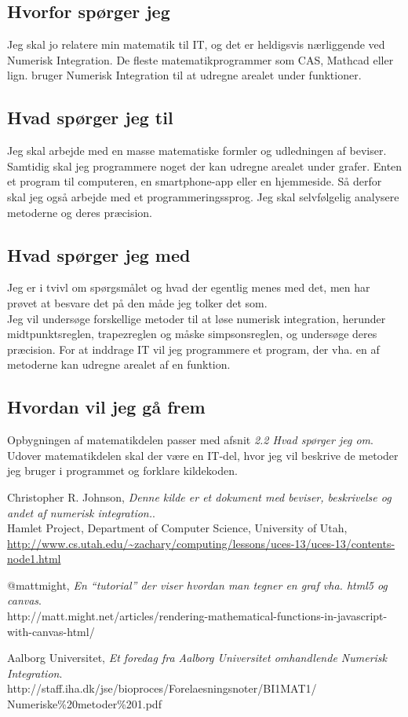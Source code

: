 \documentclass[12pt]{article}
\numberwithin{equation}{section}
\begin{document}
\subsection{Hvorfor spørger jeg}
\label{sec:hvorfor}
Jeg skal jo relatere min matematik til IT, og det er heldigsvis nærliggende ved Numerisk Integration. De fleste matematikprogrammer som CAS, Mathcad eller lign. bruger Numerisk Integration til at udregne arealet under funktioner.
\subsection{Hvad spørger jeg til}
Jeg skal arbejde med en masse matematiske formler og udledningen af beviser. Samtidig skal jeg programmere noget der kan udregne arealet under grafer. Enten et program til computeren, en smartphone-app eller en hjemmeside. Så derfor skal jeg også arbejde med et programmeringssprog. Jeg skal selvfølgelig analysere metoderne og deres præcision.
\subsection{Hvad spørger jeg med}
Jeg er i tvivl om spørgsmålet og hvad der egentlig menes med det, men har prøvet at besvare det på den måde jeg tolker det som.
\\
Jeg vil undersøge forskellige metoder til at løse numerisk integration, herunder midtpunktsreglen, trapezreglen og måske simpsonsreglen, og undersøge deres præcision. For at inddrage IT vil jeg programmere et program, der vha. en af metoderne kan udregne arealet af en funktion.

\subsection{Hvordan vil jeg gå frem}
Opbygningen af matematikdelen passer med afsnit \emph{2.2 Hvad spørger jeg om}. Udover matematikdelen skal der være en IT-del, hvor jeg vil beskrive de metoder jeg bruger i programmet og forklare kildekoden.


\clearpage
{}
\begin{thebibliography}{9}

  	Christopher R. Johnson,
  	\emph{Denne kilde er et dokument med beviser, beskrivelse og andet af numerisk integration.}.\\
  	Hamlet Project, 
  	Department of Computer Science,
	University of Utah,
	\url{http://www.cs.utah.edu/~zachary/computing/lessons/uces-13/uces-13/contents-node1.html}
	
	@mattmight,
	\emph{En ``tutorial'' der viser hvordan man tegner en graf vha. html5 og canvas}.\\
	http://matt.might.net/articles/rendering-mathematical-functions-in-javascript-with-canvas-html/

	Aalborg Universitet,
	\emph{Et foredag fra Aalborg Universitet omhandlende Numerisk Integration}.\\
	http://staff.iha.dk/jse/bioproces/Forelaesningsnoter/BI1MAT1/\\Numeriske\%20metoder\%201.pdf

\end{thebibliography}
\end{document}
